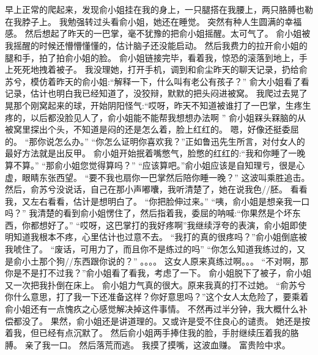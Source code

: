 \chapter{}
早上正常的爬起来，发现俞小姐挂在我的身上，一只腿搭在我腰上，两只胳膊也勒在我脖子上。
我勉强转过头看俞小姐，她还在睡觉。
突然有种人生圆满的幸福感。
然后想起了昨天的一巴掌，毫不犹豫的把俞小姐摇醒。太可气了。
俞小姐被我摇醒的时候还懵懵懂懂的，估计脑子还没能启动。 然后我费力的拉开俞小姐的腿和手，拍了拍俞小姐的脸。
俞小姐链接完毕，看着我，惊恐的滚落到地上，手上死死地拽着被子。
我没理她，打开手机，调到和俞尘昨天的聊天记录，扔给俞苏兮，模仿着昨天的俞小姐:“解释一下，什么叫有老公有孩子？”
俞大小姐看了看记录，估计也明白我已经知道了，没狡辩，默默的把头闷进被窝。
我爬过去晃了晃那个刚窝起来的球，开始阴阳怪气:“哎呀，昨天不知道被谁打了一巴掌，生疼生疼的，以后都没脸见人了，俞小姐能不能帮我想想办法啊 ”
俞小姐槑头槑脑的从被窝里探出个头，不知道是闷的还是怎么着，脸上红红的。
嗯，好像还挺委屈的。
“那你说怎么办。”
“你怎么证明你喜欢我？”正如鲁迅先生所言，对付女人的最好方法就是出反甲。
俞小姐开始抿着嘴憋气，脸憋的红红的:“我和你睡了一晚算不算。”
“那俞小姐您觉得算吗？”
“应该算吧。”俞小姐应该是自知理亏，很是心虚，眼睛东张西望。
“要不我也扇你一巴掌然后陪你睡一晚？” 这波叫乘胜追击。
然后，俞苏兮没说话，自己在那小声嘟囔，我听清楚了，她在说我色//胚。
看看我，又左右看看，估计是想明白了。
“你把脸伸过来。”
“咦，俞小姐是想亲我一口吗？”
我清楚的看到俞小姐愣住了，然后指着我，委屈的呐喊:“你果然是个坏东西，你都想好了。”
“哎呀，这巴掌打的我好疼啊”我继续浮夸的表演，俞小姐即使明知道我根本不疼，心里估计也过意不去。
“我打的真的很疼吗？”俞小姐倒底被我唬住了。
“废话，可用力了，而且你不是练过的吗”
“你怎么知道我练过的，又是俞小土那个狗//东西跟你说的？”
。。。。
这女人原来真练过啊。。。
“不对啊，那你是不是打不过我？”俞小姐看了看我，考虑了一下。
俞小姐脱下了被子，俞小姐又一次把我扑倒在床上。
俞小姐力气真的很大。原来我真的打不过她。
“俞苏兮你什么意思，打了我一下还准备这样？你好意思吗？”这个女人太危险了，要乘着俞小姐还有一点愧疚之心感觉解决掉这件事情。
不然再过半分钟，我大概什么补偿都没了。
果然，俞小姐还是讲道理的。又或许是受不住良心的谴责。
她还是按着我，但已经有点沉默了。
然后俞小姐两手捧住我的脸，手肘继续压着我的胳膊。
亲了我一口。
然后落荒而逃。
我摸了摸嘴，这波血赚。
富贵险中求。

